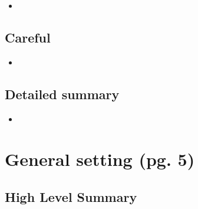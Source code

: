 \documentclass{article}
\begin{document}
    \begin{itemize}

    \item 
    
    \end{itemize}

\subsection*{Careful}

    \begin{itemize}

    \item 
    
    \end{itemize}


\subsection*{Detailed summary}

    \begin{itemize}

    \item 
    
    \end{itemize}

\section{General setting (pg. 5)}

\subsection*{High Level Summary}
\end{document}
